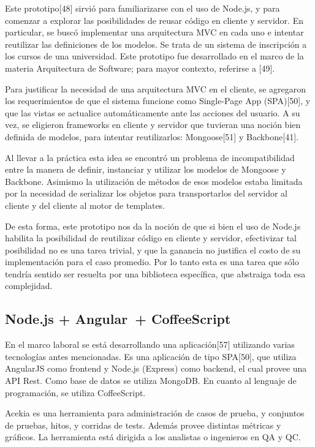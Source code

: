 \documentclass[doc,helv,longtable]{article}
\begin{document}
Este prototipo[48] sirvió para familiarizarse con el uso de Node.js, y para comenzar a explorar las posibilidades de reusar código en cliente y servidor. En particular, se buscó implementar una arquitectura MVC en cada uno e intentar reutilizar las definiciones de los modelos. Se trata de un sistema de inscripción a los cursos de una universidad. Este prototipo fue desarrollado en el marco de la materia Arquitectura de Software; para mayor contexto, referirse a [49].

Para justificar la necesidad de una arquitectura MVC en el cliente, se agregaron los requerimientos de que el sistema funcione como Single-Page App (SPA)[50], y que las vistas se actualice automáticamente ante las acciones del usuario. A su vez, se eligieron frameworks en cliente y servidor que tuvieran una noción bien definida de modelos, para intentar reutilizarlos: Mongoose[51] y Backbone[41].

Al llevar a la práctica esta idea se encontró un problema de incompatibilidad entre la manera de definir, instanciar y utilizar los modelos de Mongoose y Backbone. Asimismo la utilización de métodos de esos modelos estaba limitada por la necesidad de serializar los objetos para transportarlos del servidor al cliente y del cliente al motor de templates.

De esta forma, este prototipo nos da la noción de que si bien el uso de Node.js habilita la posibilidad de reutilizar código en cliente y servidor, efectivizar tal posibilidad no es una tarea trivial, y que la ganancia no justifica el costo de su implementación para el caso promedio. Por lo tanto esta es una tarea que sólo tendría sentido ser resuelta por una biblioteca específica, que abstraiga toda esa complejidad.\subsection{Node.js + Angular + CoffeeScript}


En el marco laboral se está desarrollando una aplicación[57] utilizando varias tecnologías antes mencionadas. Es una aplicación de tipo SPA[50], que utiliza AngularJS como frontend y Node.js (Express) como backend, el cual provee una API Rest. Como base de datos se utiliza MongoDB. En cuanto al lenguaje de programación, se utiliza CoffeeScript. 

Acekia es una herramienta para administración de casos de prueba, y conjuntos de pruebas, hitos, y corridas de tests. Además provee distintas métricas y gráficos. La herramienta está dirigida a los analistas o ingenieros en QA y QC.
\end{document}
